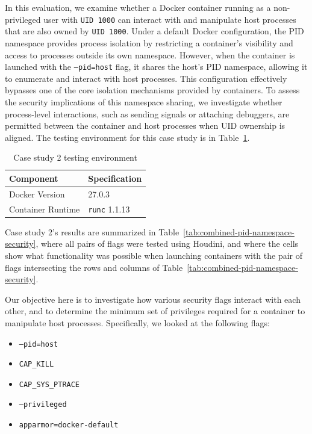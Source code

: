 \documentclass[12pt]{report}
\begin{document}
\begin{doublespace}
In this evaluation, we examine whether a Docker container running as a non-privileged user with \texttt{UID 1000} can interact with and manipulate host processes that are also owned by \texttt{UID 1000}. Under a default Docker configuration, the PID namespace provides process isolation by restricting a container's visibility and access to processes outside its own namespace. However, when the container is launched with the \texttt{--pid=host} flag, it shares the host’s PID namespace, allowing it to enumerate and interact with host processes. This configuration effectively bypasses one of the core isolation mechanisms provided by containers. To assess the security implications of this namespace sharing, we investigate whether process-level interactions, such as sending signals or attaching debuggers, are permitted between the container and host processes when UID ownership is aligned. The testing environment for this case study is in Table~\ref{table:case2env}.

\begin{table}[h!]
\caption{Case study 2 testing environment\label{table:case2env}}
\centering
\scriptsize \begin{tabular}{|l|l|} 
\hline
\textbf{Component} & \textbf{Specification} \\
\hline
Docker Version & 27.0.3 \\
\hline
Container Runtime & \texttt{runc} 1.1.13 \\
\hline
\end{tabular}
\end{table}

Case study 2's results are summarized in Table~\ref{tab:combined-pid-namespace-security}, where all pairs of flags were tested using Houdini, and where the cells show what functionality was possible when launching containers with the pair of flags intersecting the rows and columns of Table~\ref{tab:combined-pid-namespace-security}. 

Our objective here is to investigate how various security flags interact with each other, and to determine the minimum set of privileges required for a container to manipulate host processes. Specifically, we looked at the following flags:

\begin{itemize}
    \item \texttt{--pid=host}
    \item \texttt{CAP\_KILL}
    \item \texttt{CAP\_SYS\_PTRACE}
    \item \texttt{--privileged}
    \item \texttt{apparmor=docker-default}
\end{itemize}


\end{doublespace}
\end{document}
